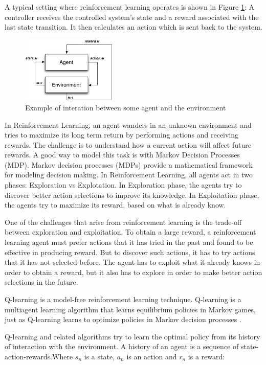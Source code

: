 \documentclass{report}
\begin{document}
A typical setting where
reinforcement learning operates is shown in Figure \ref{fig:agentenv}: A controller receives the controlled
system’s state and a reward associated with the last state transition. It then calculates an
action which is sent back to the system.


\begin{figure}
\centering
\includegraphics[width=0.4\textwidth]{./images/agentenv.png}
\caption{Example of interation between some agent and the environment}
\label{fig:agentenv}
\end{figure}

In Reinforcement Learning, an agent wanders in an unknown environment and tries to maximize its long term return by performing actions and receiving rewards. The challenge is to understand how a current action will affect future rewards. A good way to model this task is with Markov Decision Processes (MDP). Markov decision processes (MDPs) provide a mathematical framework for modeling decision making. In Reinforcement Learning, all agents act in two phases: Exploration vs Explotation. In Exploration phase, the agents try to discover better action selections to improve its knowledge. In Exploitation phase, the agents try to maximize its reward, based on what is already know.

One of the challenges that arise from reinforcement learning is the trade-off between exploration and exploitation. To obtain a large reward, a reinforcement learning
agent must prefer actions that it has tried in the past and found to be effective in producing reward. But to discover such actions, it has to try actions that it has not selected before. The agent has to exploit what it already knows in order to obtain a reward, but it also has to explore in order to make better action selections in the future.

Q-learning is a model-free reinforcement learning technique. Q-learning is a multiagent learning algorithm that learns equilibrium policies in Markov games, just as Q-learning learns to optimize policies in Markov decision processes \cite{Greenwald2003}. 

Q-learning and related algorithms try to learn the optimal policy from its history of interaction with the environment. A history of an agent is a sequence of state-action-rewards.Where $s_{n}$ is a state, $a_{n}$ is an action and $r_{n}$ is a reward:
\end{document}
